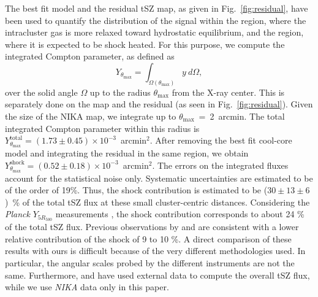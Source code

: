 The best fit model and the residual tSZ map, as given in Fig.~\ref{fig:residual}, have been used to quantify the distribution of the signal within the region, where the intracluster gas is more relaxed toward hydrostatic equilibrium, and the region, where it is expected to be shock heated. For this purpose, we compute the integrated Compton parameter, as defined as 
	\begin{equation}
	Y_{\theta_{\mathrm{max}}} =  \int_{\Omega(\theta_{\mathrm{max}})} y \ d\Omega,
	\label{eq:y_integ}
 	\end{equation}
	over the solid angle $\Omega$ up to the radius $\theta_{\mathrm{max}}$ from the \mbox{X-ray} center. This is separately done on the map and the residual (as seen in Fig.~\ref{fig:residual}). Given the size of the NIKA map, we integrate up to $\theta_{\mathrm{max}}$~=~2~arcmin. The total integrated Compton parameter within this radius is $Y^{\mathrm{total}}_{\theta_{\mathrm{max}}} =  (1.73 \pm 0.45) \times 10^{-3}$~arcmin$^2$. After removing the best fit cool-core model and integrating the residual in the same region, we obtain $Y^{\mathrm{shock}}_{\theta_{\mathrm{max}}} = (0.52 \pm 0.18) \times 10^{-3}$~arcmin$^2$. The errors on the integrated fluxes account for the statistical noise only. Systematic uncertainties are estimated to be of the order of 19\%. Thus, the shock contribution is estimated to be ($30 \pm 13 \pm 6$)~\% of the total tSZ flux at these small cluster-centric distances. Considering the {\it Planck} $Y_{5R_{500}}$ measurements \citep{Planck_fit}, the shock contribution corresponds to about 24 \% of the total tSZ flux. Previous observations by \cite{mason_2010} and \cite{plagge_2012} are consistent with a lower relative contribution of the shock of 9 to 10 \%. A direct comparison of these results with ours is difficult because of the very different methodologies used. In particular, the angular scales probed by the different instruments are not the same. Furthermore, \cite{mason_2010} and \cite{plagge_2012} have used external data to compute the overall tSZ flux, while we use {\it NIKA} data only in this paper.

